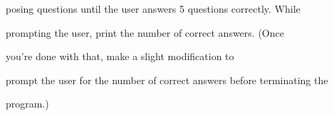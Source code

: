 posing questions until the user answers 5 questions correctly. While

prompting the user, print the number of correct answers. (Once

you're done with that, make a slight modification to

prompt the user for the number of correct answers before terminating the

program.)

